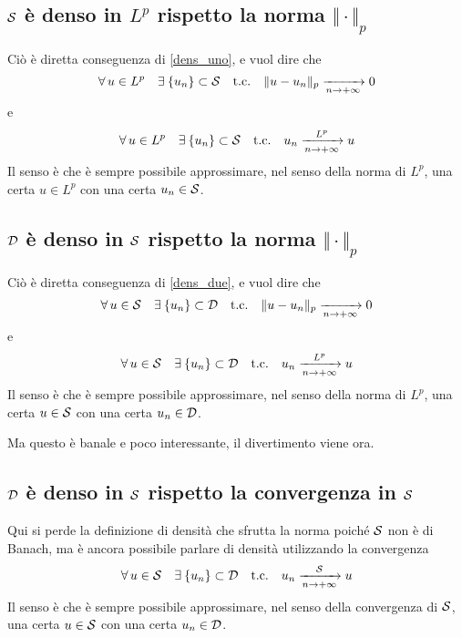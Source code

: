 \subsection{\texorpdfstring{$\mathcal{S}$}{C} è denso in \texorpdfstring{$L^p$}{C} rispetto la norma \texorpdfstring{$\Vert\cdot\Vert_p$}{C}}

Ciò è diretta conseguenza di \eqref{dens_uno}, e vuol dire che
\begin{equation*}
\forall u\in L^p\quad\exists\{u_n\}\subset\Sc\quad\text{t.c.}\quad \Vert u-u_n\Vert_p \xrightarrow[n\to+\infty]{} 0
\end{equation*}
e
\begin{equation*}
\forall u\in L^p\quad\exists\{u_n\}\subset\Sc\quad\text{t.c.}\quad u_n\xrightarrow[n\to+\infty]{L^p}u
\end{equation*}
Il senso è che è sempre possibile approssimare, nel senso della norma di $L^p$, una certa $u\in L^p$ con una certa $u_n\in\mathcal{S}$.


\subsection{\texorpdfstring{$\mathcal{D}$}{C} è denso in \texorpdfstring{$\mathcal{S}$}{C} rispetto la norma \texorpdfstring{$\Vert\cdot\Vert_p$}{C}}

Ciò è diretta conseguenza di \eqref{dens_due}, e vuol dire che
\begin{equation*}
\forall u\in \Sc\quad\exists\{u_n\}\subset\Dc\quad\text{t.c.}\quad \Vert u-u_n\Vert_p \xrightarrow[n\to+\infty]{} 0
\end{equation*}
e
\begin{equation*}
\forall u\in \Sc\quad\exists\{u_n\}\subset\Dc\quad\text{t.c.}\quad u_n\xrightarrow[n\to+\infty]{L^p}u
\end{equation*}
Il senso è che è sempre possibile approssimare, nel senso della norma di $L^p$, una certa $u\in \mathcal{S}$ con una certa $u_n\in\mathcal{D}$.

Ma questo è banale e poco interessante, il divertimento viene ora.


\subsection{\texorpdfstring{$\mathcal{D}$}{C} è denso in \texorpdfstring{$\mathcal{S}$}{C} rispetto la convergenza in \texorpdfstring{$\mathcal{S}$}{C}}

Qui si perde la definizione di densità che sfrutta la norma poiché $\mathcal{S}$ non è di Banach, ma è ancora possibile parlare di densità utilizzando la convergenza 
\begin{equation*}
\forall u\in \Sc\quad\exists\{u_n\}\subset\Dc\quad\text{t.c.}\quad u_n\xrightarrow[n\to+\infty]{\Sc}u
\end{equation*}
Il senso è che è sempre possibile approssimare, nel senso della convergenza di $\mathcal{S}$, una certa $u\in \mathcal{S}$ con una certa $u_n\in\mathcal{D}$.